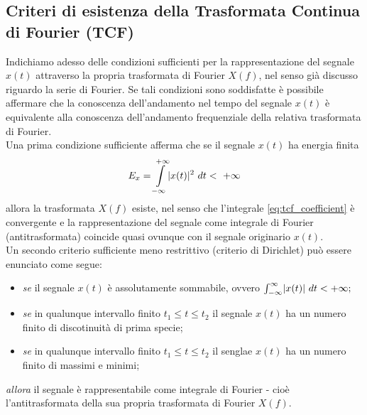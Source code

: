 \documentclass[12pt,oneside,openany]{memoir}
\numberwithin{equation}{subsection}
\DeclarePairedDelimiter{\abs}{\lvert}{\rvert}
\newcommand{\dt}{\ dt}
\begin{document}
\subsection{Criteri di esistenza della Trasformata Continua di Fourier (TCF)}
Indichiamo adesso delle condizioni sufficienti per la rappresentazione del
segnale $x(t)$ attraverso la propria trasformata di Fourier $X(f)$, nel senso
gi\`a discusso riguardo la serie di Fourier. Se tali condizioni sono soddisfatte
\`e possibile affermare che la conoscenza dell'andamento nel tempo del segnale
$x(t)$ \`e equivalente alla conoscenza dell'andamento frequenziale della
relativa trasformata di Fourier.\\
Una prima condizione sufficiente afferma che se il segnale $x(t)$ ha energia
finita
\begin{equation}
	E_x = \int\displaylimits_{-\infty}^{+\infty} \abs{x(t)}^2 \dt < \ +\infty
\end{equation}
allora la trasformata $X(f)$ esiste, nel senso che l'integrale
\eqref{eq:tcf_coefficient} \`e convergente e la rappresentazione del segnale
come integrale di Fourier (antitrasformata) coincide quasi ovunque con il
segnale originario $x(t)$.\\
Un secondo criterio sufficiente meno restrittivo (criterio di Dirichlet) pu\`o
essere enunciato come segue:
\begin{itemize}
	\item \textit{se} il segnale $x(t)$ \`e assolutamente sommabile, ovvero
		$\int_{-\infty}^{\infty} \abs{x(t)} \dt < +\infty;$
	\item \textit{se} in qualunque intervallo finito $t_1 \leq t \leq t_2$
		il segnale $x(t)$ ha un numero finito di discotinuit\`a di
		prima specie;
	\item \textit{se} in qualunque intervallo finito $t_1 \leq t \leq t_2$
		il senglae $x(t)$ ha un numero finito di massimi e minimi;
\end{itemize}
\textit{allora} il segnale \`e rappresentabile come integrale di Fourier -
cio\`e l'antitrasformata della sua propria trasformata di Fourier $X(f)$.


\newpage
\end{document}
